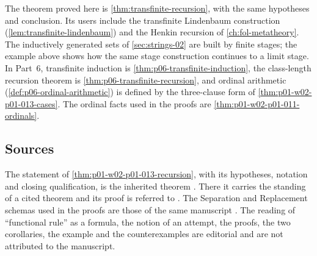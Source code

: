 The theorem proved here is \cref{thm:transfinite-recursion}, with the same
hypotheses and conclusion. Its users include the
transfinite Lindenbaum construction (\cref{lem:transfinite-lindenbaum}) and
the Henkin recursion of \cref{ch:fol-metatheory}. The inductively generated
sets of \cref{sec:strings-02} are built by finite stages; the example above
shows how the same stage construction continues to a limit stage. In Part~6,
transfinite induction is \cref{thm:p06-transfinite-induction}, the
class-length recursion theorem is \cref{thm:p06-transfinite-recursion}, and
ordinal arithmetic (\cref{def:p06-ordinal-arithmetic}) is defined by the
three-clause form of \cref{thm:p01-w02-p01-013-cases}. The ordinal facts used
in the proofs are \cref{thm:p01-w02-p01-011-ordinals}.

\subsection{Sources}
\label{sec:p01-w02-p01-013-sources}

The statement of \cref{thm:p01-w02-p01-013-recursion}, with its hypotheses,
notation and closing qualification, is the inherited theorem
\cite[ch.~``Sets, Relations, Functions, and Cardinality'', sec.~``Finite,
countable, and uncountable sets'', theorem ``Transfinite
recursion'']{FrozenFormalLogicTransfiniteRecursion}. There it carries the
standing of a cited theorem and its proof is referred to \cite{Jech2003}.
The Separation and Replacement schemas used in the proofs are those of the
same manuscript \cite[ch.~``The Axioms of ZF and ZFC'', sec.~``The language
and the axiom schemas'', definitions ``Separation schema'' and
``Replacement schema'']{FrozenFormalLogicTransfiniteRecursion}. The reading of
``functional rule'' as a formula, the notion of an attempt, the proofs, the
two corollaries, the example and the counterexamples are editorial and are
not attributed to the manuscript.
